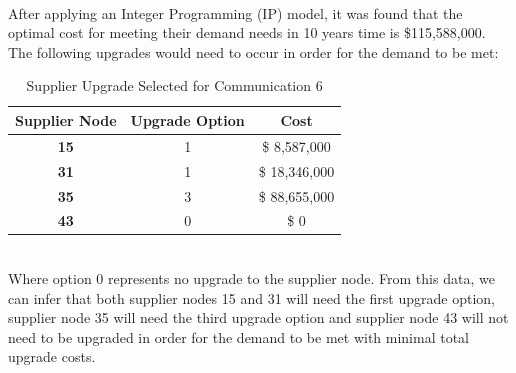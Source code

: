 \documentclass{article}
\begin{document}
\\
After applying an Integer Programming (IP) model, it was found that the optimal cost for meeting their demand needs in 10 years time is \$115,588,000. The following upgrades would need to occur in order for the demand to be met:\\
\renewcommand\baselinestretch{1.5}
\begin{table}[htb]
    \centering
    \color{black}
    \begin{tabular}{|c:c:c|}
        \hline
        \textbf{Supplier Node} & \textbf{Upgrade Option} & \textbf{Cost} \\
        \hline
        \textbf{15} & 1 & \$  8,587,000 \\ \hdashline
        \textbf{31} & 1 & \$ 18,346,000 \\ \hdashline
        \textbf{35} & 3 & \$ 88,655,000 \\ \hdashline
        \textbf{43} & 0 & \$ 0 \\ \hline
    \end{tabular}
    \caption{Supplier Upgrade Selected for Communication 6}
    \label{tab:upgradeoptscomm6}
\end{table}
\renewcommand\baselinestretch{1}
\noindent \\
Where option 0 represents no upgrade to the supplier node. From this data, we can infer that both supplier nodes 15 and 31 will need the first upgrade option, supplier node 35 will need the third upgrade option and supplier node 43 will not need to be upgraded in order for the demand to be met with minimal total upgrade costs.
\\
\newpage
\end{document}
